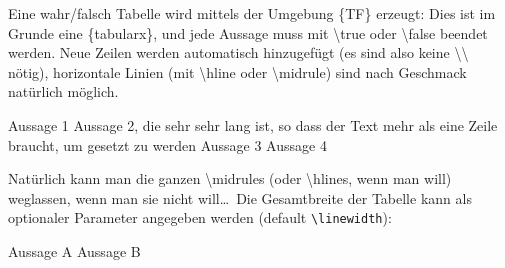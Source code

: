 \documentclass[hyperworksheet]{drcschool}
\newcommand*{\cs}[1]{\textup{\ttfamily\textbackslash#1}}                   %
\newcommand*{\env}[1]{\textup{\ttfamily\{#1\}}}                            %
\begin{document}
\begin{worksheet}
Eine wahr/falsch Tabelle wird mittels der Umgebung \env{TF} erzeugt: Dies ist im Grunde
eine \env{tabularx}, und jede Aussage muss mit \cs{true} oder \cs{false} beendet werden.
Neue Zeilen werden automatisch hinzugefügt (es sind also keine \cs{\textbackslash} nötig),
horizontale Linien (mit \cs{hline} oder \cs{midrule}) sind nach Geschmack natürlich möglich.
\begin{center}
\begin{TF}
Aussage 1 \true
\midrule
Aussage 2, die sehr sehr lang ist, so dass der Text mehr als eine Zeile braucht, um gesetzt zu werden \false
\midrule
Aussage 3 \false
\midrule
Aussage 4 \true
\end{TF}
\end{center}
Natürlich kann man die ganzen \cs{midrule}s (oder \cs{hline}s, wenn man will) weglassen,
wenn man sie nicht will\ldots\ Die Gesamtbreite der Tabelle kann als optionaler Parameter
angegeben werden (default \texttt{\textbackslash linewidth}):

\noindent
\begin{TF}[.35\linewidth]
Aussage A \true
Aussage B \false
\end{TF}

\end{worksheet}

\end{document}

